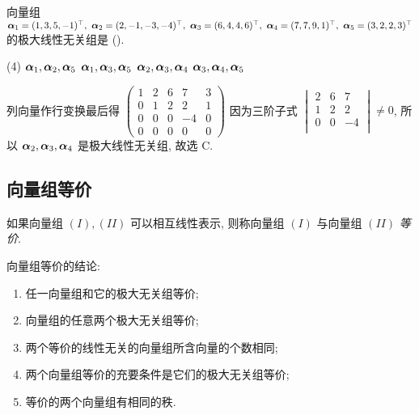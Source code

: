 \begin{example}
    向量组 $\vb*{\alpha}_1=(1,3,5,-1)^\top,~\vb*{\alpha}_2=(2,-1,-3,-4)^\top,~\vb*{\alpha}_3=(6,4,4,6)^\top,~\vb*{\alpha}_4=(7,7,9,1)^\top,~\vb*{\alpha}_5=(3,2,2,3)^\top$ 的极大线性无关组是 (\quad).
    \begin{tasks}(4)
        \task $\vb*{\alpha}_1,\vb*{\alpha}_2,\vb*{\alpha}_5$
        \task $\vb*{\alpha}_1,\vb*{\alpha}_3,\vb*{\alpha}_5$
        \task $\vb*{\alpha}_2,\vb*{\alpha}_3,\vb*{\alpha}_4$
        \task $\vb*{\alpha}_3,\vb*{\alpha}_4,\vb*{\alpha}_5$
    \end{tasks}
\end{example}
\begin{solution}
    列向量作行变换最后得 $\begin{pmatrix} 1 & 2 & 6 & 7 & 3 \\ 0 & 1 & 2 & 2 & 1 \\ 0 & 0 & 0 & -4 & 0 \\ 0 & 0 & 0 & 0 & 0\end{pmatrix}$
    因为三阶子式 $\begin{vmatrix} 2 & 6 & 7 \\ 1 & 2 & 2 \\ 0 & 0 & -4 \\\end{vmatrix}\neq0$, 所以 $\vb*{\alpha}_2,\vb*{\alpha}_3,\vb*{\alpha}_4$ 是极大线性无关组, 故选 C.
\end{solution}

\subsection{向量组等价}

\begin{definition}[向量组等价]
    如果向量组 $(I),(II)$ 可以相互线性表示, 则称向量组 $(I)$ 与向量组 $(II)$ \textit{等价}.
\end{definition}

向量组等价的结论:
\begin{enumerate}[label=(\arabic{*})]
    \item 任一向量组和它的极大无关组等价;
    \item 向量组的任意两个极大无关组等价;
    \item 两个等价的线性无关的向量组所含向量的个数相同;
    \item 两个向量组等价的充要条件是它们的极大无关组等价;
    \item 等价的两个向量组有相同的秩.
\end{enumerate}

